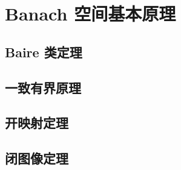 \section{Banach 空间基本原理}
\label{b1:sec:0803}


\subsection{Baire 类定理}
\label{b1:subsec:080301}

\subsection{一致有界原理}
\label{b1:subsec:080302}

\subsection{开映射定理}
\label{b1:subsec:080303}

\subsection{闭图像定理}
\label{b1:subsec:080304}


